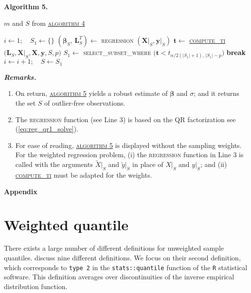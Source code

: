 \documentclass[a4paper,oneside,11pt,DIV=12]{scrartcl}
\newcommand{\code}[1]{{\texttt{#1}}}
\begin{document}
\vspace{1em}
\noindent \textbf{\sffamily Algorithm 5.}
\begin{algorithmic}[1]
	\hypertarget{alg:alg5}{\Require $m$ and $S$ from
		\hyperlink{alg:alg4}{\textsc{algorithm} 4}}
	\State $i \gets 1; \quad S_1 \gets \{\}$
		\State $(\bm \beta_S, \, \bm L_S^T) \gets$ \textsc{regression}
			$(\bm X\vert_S, \bm y\vert_S)$
		\State $\bm t \gets$ \hyperlink{alg:computeti}{\textsc{compute\_ti}}
			$\big(\bm L_S, \bm X\vert_{S}, \bm X, \bm y, S, p\big)$
		\State $S_1 \gets$ \textsc{select\_subset\_where}
			$\big(\bm t < t_{\alpha/2(\vert S_1 \vert +1),
			\,\vert S_1 \vert - p}\big)$
			\State \textbf{break}
		\EndIf
		\State $i \gets i + 1; \quad S \gets S_1$
	\EndWhile
\end{algorithmic}
\vspace{1em}
\noindent\textbf{\sffamily \small \itshape Remarks.}
\vspace{-0.5em}
\begin{enumerate}[1)]
	\item On return, \hyperlink{alg:alg5}{\textsc{algorithm} 5} yields a
		robust estimate of $\bm \beta$ and $\sigma$; and it returns the set
		$S$ of outlier-free observations.
	\item The \textsc{regression} function (see Line 3) is based on the QR
		factorization see (\ref{eq:reg_qr1_solve}).
	\item For ease of reading, \hyperlink{alg:alg5}{\textsc{algorithm} 5} is
		displayed without the sampling weights. For the weighted regression
		problem, (i) the \textsc{regression} function in Line 3 is called with
		the arguments $\widetilde{X}\vert_S$ and $\widetilde{y}\vert_S$ in
		place of $X\vert_S$ and $y\vert_S$; and (ii)
		\hyperlink{alg:computeti}{\textsc{compute\_ti}} must be adapted for
		the weights.
\end{enumerate}


\clearpage
\begin{center}
{\sffamily\bfseries\LARGE Appendix}
\end{center}
\appendix
\section{Weighted quantile}\label{sec:utility}
There exists a large number of different definitions for unweighted
sample quantiles. \citet{hyndman_fan_1996} discuss nine different
definitions. We focus on their second definition, which corresponds to
\code{type 2} in the \code{stats::quantile} function of the \code{R}
statistical software. This definition averages over discontinuities of
the inverse empirical distribution function.
\end{document}

